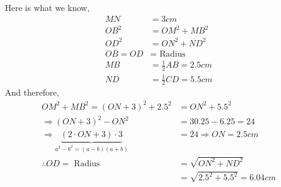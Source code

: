 \begin{solution}
	Here is what we know,
	\begin{align}
		MN &= 3cm \\
		OB^2 &= OM^2 + MB^2 \\
		OD^2 &= ON^2 + ND^2 \\
		OB = OD &= \text{ Radius } \\
		MB &= \frac{1}{2}AB = 2.5cm \\
		ND &= \frac{1}{2}CD = 5.5cm
	\end{align}
	And therefore, 
	\begin{align}
		OM^2 + MB^2 = (ON + 3)^2 + 2.5^2 &= ON^2 + 5.5^2 \\
		\Rightarrow (ON+3)^2 - ON^2 &= 30.25 - 6.25 = 24 \\
		\Rightarrow \underbrace{(2\cdot ON + 3)\cdot 3}_{a^2-b^2 = (a-b)(a+b)} &= 24 \Rightarrow ON = 2.5cm \\
		\therefore OD = \text{ Radius } &= \sqrt{ON^2 + ND^2} \\ 
		&= \sqrt{2.5^2 + 5.5^2} = 6.04cm
	\end{align}
\end{solution}

